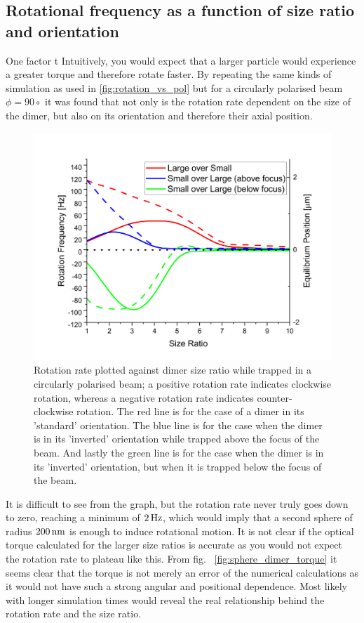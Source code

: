 \subsection{Rotational frequency as a function of size ratio and 
	orientation}
\label{sec:rot_size}	
One factor t Intuitively, you would expect that a 
larger particle would experience a greater torque and therefore 
rotate faster. By repeating the same kinds of simulation as used 
in \ref{fig:rotation_vs_pol} but for a circularly polarised beam 
$\phi=90\circ$ it was found that not only is the rotation rate 
dependent on the size of the dimer, but also on its orientation 
and therefore their axial position.
\begin{figure}[h!]
  \centering
  \includegraphics[width=\linewidth]{rotation_rate_vs_size.png}
  \caption{Rotation rate plotted against dimer size ratio while 
  	trapped in a circularly polarised beam; a positive rotation 
  	rate indicates clockwise rotation, whereas a negative 
  	rotation rate indicates counter-clockwise rotation. The red 
  	line is for the case of a dimer in its 'standard' orientation. 
  	The blue line is for the case when the dimer is in its 
  	'inverted' orientation while trapped above the focus of the 
  	beam. And lastly the green line is for the case when the 
  	dimer is in its 'inverted' orientation, but when it is trapped 
  	below the focus of the beam.}
\end{figure}

It is difficult to see from the graph, but the rotation rate never
truly goes down to zero, reaching a minimum of $2\,{\rm Hz}$, which 
would imply that a second sphere of radius $200\,{\rm nm}$ is enough 
to induce rotational motion. It is not clear if the optical torque 
calculated for the larger size ratios is accurate as you would not 
expect the rotation rate to plateau like this. From fig.~
\ref{fig:sphere_dimer_torque} it seems clear that the torque is not
merely an error of the numerical calculations as it would not have 
such a strong angular and positional dependence. Most likely with 
longer simulation times would reveal the real relationship behind
the rotation rate and the size ratio. 

